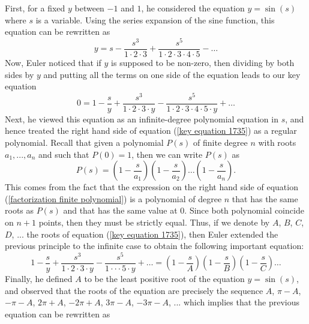 First, for a fixed $y$ between $-1$ and $1$, he considered the equation $y = \sin(s)$ where $s$ is a variable. Using the series expansion of the sine function, this equation can be rewritten as
\begin{equation} \label{y = s - s^3/3!}
    y = s - \frac{s^3}{1\cdot 2 \cdot 3} + \frac{s^5}{1\cdot 2\cdot 3 \cdot 4 \cdot 5} - \dots
\end{equation}
Now, Euler noticed that if $y$ is supposed to be non-zero, then dividing by both sides by $y$ and putting all the terms on one side of the equation leads to our key equation
\begin{equation} \label{key equation 1735}
    0 = 1 - \frac{s}{y} + \frac{s^3}{1\cdot 2 \cdot 3\cdot y} - \frac{s^5}{1\cdot 2\cdot 3 \cdot 4 \cdot 5 \cdot y} + \dots
\end{equation}
Next, he viewed this equation as an infinite-degree polynomial equation in $s$, and hence treated the right hand side of equation (\ref{key equation 1735}) as a regular polynomial. Recall that given a polynomial $P(s)$ of finite degree $n$ with roots $a_1, ..., a_n$ and such that $P(0) = 1$, then we can write $P(s)$ as 
\begin{equation} \label{factorization finite polynomial}
P(s) = \left(1 - \frac{s}{a_1}\right)\left(1 - \frac{s}{a_2}\right) \dots \left(1 - \frac{s}{a_n}\right).
\end{equation}
This comes from the fact that the expression on the right hand side of equation (\ref{factorization finite polynomial}) is a polynomial of degree $n$ that has the same roots as $P(s)$ and that has the same value at 0. Since both polynomial coincide on $n+1$ points, then they must be strictly equal. Thus, if we denote by $A$, $B$, $C$, $D$, ... the roots of equation (\ref{key equation 1735}), then Euler extended the previous principle to the infinite case to obtain the following important equation:
\begin{equation} \label{equality between series and product}
    1 - \frac{s}{y} + \frac{s^3}{1\cdot 2 \cdot 3\cdot y} - \frac{s^5}{1\cdot \cdot \cdot 5 \cdot y} + \dots = \left(1 - \frac{s}{A}\right)\left(1 - \frac{s}{B}\right)\left(1 - \frac{s}{C}\right) \dots
\end{equation}
Finally, he defined $A$ to be the least positive root of the equation $y = \sin(s)$, and observed that the roots of the equation are precisely the sequence $A$, $\pi - A$, $-\pi - A$, $2\pi + A$, $-2\pi + A$, $3\pi - A$, $-3\pi - A$, ... which implies that the previous equation can be rewritten as 
